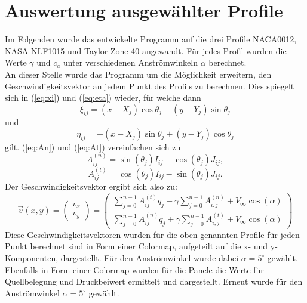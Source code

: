 \section{Auswertung ausgewählter Profile}
Im Folgenden wurde das entwickelte Programm auf die drei Profile NACA0012, NASA NLF1015 und Taylor Zone-40 angewandt. Für jedes Profil wurden die Werte $\gamma$ und $c_a$ unter verschiedenen Anströmwinkeln $\alpha $ berechnet. \\
An dieser Stelle wurde das Programm um die Möglichkeit erweitern, den Geschwindigkeitsvektor an jedem Punkt des Profils zu berechnen. Dies spiegelt sich in (\ref{eq:xi}) und (\ref{eq:eta}) wieder, für welche dann
\begin{equation}
\xi_{ij} =  (x - X_j) \cos \theta _j + (y - Y_j) \sin \theta _j
\end{equation}
und
\begin{equation}
\eta_{ij} =  -(x - X_j) \sin \theta _j + (y - Y_j) \cos \theta _j
\end{equation}
gilt. (\ref{eq:An}) und (\ref{eq:At}) vereinfachen sich zu
\begin{equation}
A_{ij}^{(n)} = \sin {(\theta _j)} I_{ij} + \cos{( \theta _j)} J_{ij},
\end{equation}
\begin{equation}
A_{ij}^{(t)} =  \cos{(\theta _j)} I_{ij} - \sin{( \theta _j)} J_{ij}.
\end{equation}
Der Geschwindigkeitsvektor ergibt sich also zu:
\begin{equation}
\vec v (x,y) = 
\begin{pmatrix}
v_x \\
v_y
\end{pmatrix}
=
\begin{pmatrix}
\sum_{j=0}^{n-1} A_{ij}^{(t)} q_j - \gamma \sum_{j=0}^{n-1}A_{i,j}^{(n)} + V_{\infty} \cos{(\alpha)} \\
\sum_{j=0}^{n-1} A_{ij}^{(n)} q_j + \gamma \sum_{j=0}^{n-1}A_{i,j}^{(t)} + V_{\infty} \cos{(\alpha)}
\end{pmatrix}
\end{equation}
Diese Geschwindigkeitsvektoren wurden für die oben genannten Profile für jeden Punkt berechnet sind in Form einer Colormap, aufgeteilt auf die x- und y-Komponenten, dargestellt. Für den Anströmwinkel wurde dabei $\alpha =5^{\circ}$ gewählt. \\
Ebenfalls in Form einer Colormap wurden für die Panele die Werte für Quellbelegung und Druckbeiwert ermittelt und dargestellt. Erneut wurde für den Anströmwinkel $\alpha =5^{\circ}$ gewählt.

